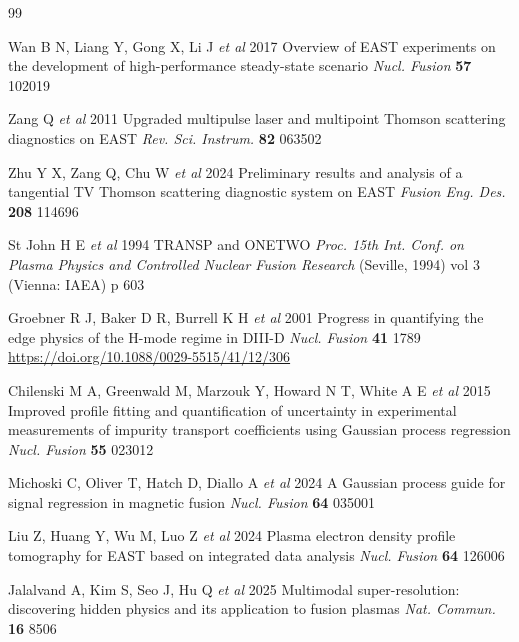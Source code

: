 \documentclass[a4paper,12pt]{article}
\begin{document}
\begin{thebibliography}{99}

Wan B N, Liang Y, Gong X, Li J \textit{et al} 2017 Overview of EAST experiments on the development of high-performance steady-state scenario \textit{Nucl. Fusion} \textbf{57} 102019

Zang Q \textit{et al} 2011 Upgraded multipulse laser and multipoint Thomson scattering diagnostics on EAST \textit{Rev. Sci. Instrum.} \textbf{82} 063502

Zhu Y X, Zang Q, Chu W \textit{et al} 2024 Preliminary results and analysis of a tangential TV Thomson scattering diagnostic system on EAST \textit{Fusion Eng. Des.} \textbf{208} 114696

St John H E \textit{et al} 1994 TRANSP and ONETWO \textit{Proc. 15th Int. Conf. on Plasma Physics and Controlled Nuclear Fusion Research} (Seville, 1994) vol 3 (Vienna: IAEA) p 603

Groebner R J, Baker D R, Burrell K H \textit{et al} 2001 Progress in quantifying the edge physics of the H-mode regime in DIII-D \textit{Nucl. Fusion} \textbf{41} 1789 \url{https://doi.org/10.1088/0029-5515/41/12/306}

Chilenski M A, Greenwald M, Marzouk Y, Howard N T, White A E \textit{et al} 2015 Improved profile fitting and quantification of uncertainty in experimental measurements of impurity transport coefficients using Gaussian process regression \textit{Nucl. Fusion} \textbf{55} 023012

Michoski C, Oliver T, Hatch D, Diallo A \textit{et al} 2024 A Gaussian process guide for signal regression in magnetic fusion \textit{Nucl. Fusion} \textbf{64} 035001

Liu Z, Huang Y, Wu M, Luo Z \textit{et al} 2024 Plasma electron density profile tomography for EAST based on integrated data analysis \textit{Nucl. Fusion} \textbf{64} 126006

Jalalvand A, Kim S, Seo J, Hu Q \textit{et al} 2025 Multimodal super-resolution: discovering hidden physics and its application to fusion plasmas \textit{Nat. Commun.} \textbf{16} 8506


\end{thebibliography}
\end{document}
